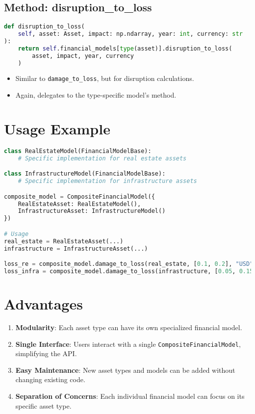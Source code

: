 \documentclass{article}
\begin{document}
\subsection{Method: disruption\_to\_loss}

\begin{lstlisting}[language=Python]
def disruption_to_loss(
    self, asset: Asset, impact: np.ndarray, year: int, currency: str
):
    return self.financial_models[type(asset)].disruption_to_loss(
        asset, impact, year, currency
    )
\end{lstlisting}

\begin{itemize}
    \item Similar to \texttt{damage\_to\_loss}, but for disruption calculations.
    \item Again, delegates to the type-specific model's method.
\end{itemize}

\section{Usage Example}

\begin{lstlisting}[language=Python]
class RealEstateModel(FinancialModelBase):
    # Specific implementation for real estate assets

class InfrastructureModel(FinancialModelBase):
    # Specific implementation for infrastructure assets

composite_model = CompositeFinancialModel({
    RealEstateAsset: RealEstateModel(),
    InfrastructureAsset: InfrastructureModel()
})

# Usage
real_estate = RealEstateAsset(...)
infrastructure = InfrastructureAsset(...)

loss_re = composite_model.damage_to_loss(real_estate, [0.1, 0.2], "USD")
loss_infra = composite_model.damage_to_loss(infrastructure, [0.05, 0.15], "USD")
\end{lstlisting}

\section{Advantages}

\begin{enumerate}
    \item \textbf{Modularity}: Each asset type can have its own specialized financial model.
    \item \textbf{Single Interface}: Users interact with a single \texttt{CompositeFinancialModel}, simplifying the API.
    \item \textbf{Easy Maintenance}: New asset types and models can be added without changing existing code.
    \item \textbf{Separation of Concerns}: Each individual financial model can focus on its specific asset type.
\end{enumerate}
\end{document}
